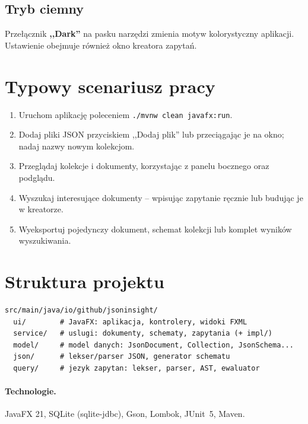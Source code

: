 \documentclass[a4paper,12pt]{article}
\begin{document}
\subsection{Tryb ciemny}

Przełącznik \textbf{,,Dark''} na pasku narzędzi zmienia motyw kolorystyczny aplikacji.
Ustawienie obejmuje również okno kreatora zapytań.

\section{Typowy scenariusz pracy}

\begin{enumerate}[noitemsep]
  \item Uruchom aplikację poleceniem \texttt{./mvnw clean javafx:run}.
  \item Dodaj pliki JSON przyciskiem ,,Dodaj plik'' lub przeciągając je na okno;
        nadaj nazwy nowym kolekcjom.
  \item Przeglądaj kolekcje i dokumenty, korzystając z panelu bocznego oraz podglądu.
  \item Wyszukaj interesujące dokumenty -- wpisując zapytanie ręcznie lub budując je
        w kreatorze.
  \item Wyeksportuj pojedynczy dokument, schemat kolekcji lub komplet wyników
        wyszukiwania.
\end{enumerate}

\section{Struktura projektu}

\begin{lstlisting}
src/main/java/io/github/jsoninsight/
  ui/        # JavaFX: aplikacja, kontrolery, widoki FXML
  service/   # uslugi: dokumenty, schematy, zapytania (+ impl/)
  model/     # model danych: JsonDocument, Collection, JsonSchema...
  json/      # lekser/parser JSON, generator schematu
  query/     # jezyk zapytan: lekser, parser, AST, ewaluator
\end{lstlisting}

\paragraph{Technologie.} JavaFX 21, SQLite (sqlite-jdbc), Gson, Lombok, JUnit~5, Maven.
\end{document}
